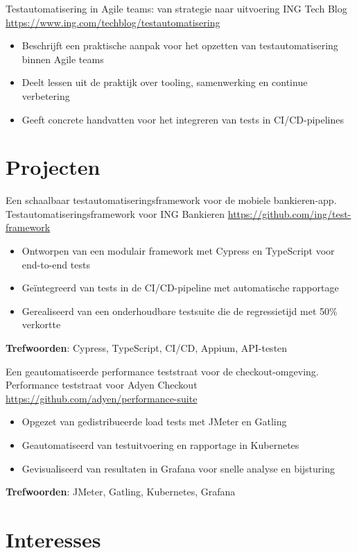 \documentclass[a4paper, serif, 10pt]{moderncv}
\begin{document}
        {Testautomatisering in Agile teams: van strategie naar uitvoering}
        {ING Tech Blog}
        {\url{https://www.ing.com/techblog/testautomatisering}}
        {}
        {\begin{itemize}
\item Beschrijft een praktische aanpak voor het opzetten van testautomatisering binnen Agile teams
\item Deelt lessen uit de praktijk over tooling, samenwerking en continue verbetering
\item Geeft concrete handvatten voor het integreren van tests in CI/CD-pipelines
\end{itemize}}
\section{Projecten}

        {Een schaalbaar testautomatiseringsframework voor de mobiele bankieren-app.}
        {Testautomatiseringsframework voor ING Bankieren}
        {\url{https://github.com/ing/test-framework}}
        {}
        {\begin{itemize}
\item Ontworpen van een modulair framework met Cypress en TypeScript voor end-to-end tests
\item Geïntegreerd van tests in de CI/CD-pipeline met automatische rapportage
\item Gerealiseerd van een onderhoudbare testsuite die de regressietijd met 50\% verkortte
\end{itemize}
\textbf{Trefwoorden}: Cypress, TypeScript, CI/CD, Appium, API-testen}

        {Een geautomatiseerde performance teststraat voor de checkout-omgeving.}
        {Performance teststraat voor Adyen Checkout}
        {\url{https://github.com/adyen/performance-suite}}
        {}
        {\begin{itemize}
\item Opgezet van gedistribueerde load tests met JMeter en Gatling
\item Geautomatiseerd van testuitvoering en rapportage in Kubernetes
\item Gevisualiseerd van resultaten in Grafana voor snelle analyse en bijsturing
\end{itemize}
\textbf{Trefwoorden}: JMeter, Gatling, Kubernetes, Grafana}
\section{Interesses}
\end{document}
